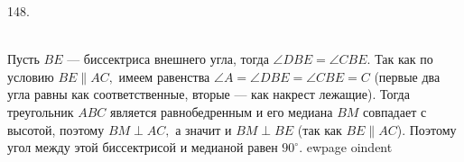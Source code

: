 148. \begin{figure}[ht!]
\end{figure}\\
Пусть $BE$ --- биссектриса внешнего угла, тогда $\angle DBE=\angle CBE.$ Так как по условию $BE\parallel AC,$ имеем равенства $\angle A=\angle DBE=\angle CBE=C$ (первые два угла равны как соответственные, вторые --- как накрест лежащие). Тогда треугольник $ABC$ является равнобедренным и его медиана $BM$ совпадает с высотой, поэтому $BM\perp AC,$ а значит и $BM\perp BE$ (так как $BE\parallel AC$). Поэтому угол между этой биссектрисой и медианой равен $90^\circ.$
ewpage
oindent
